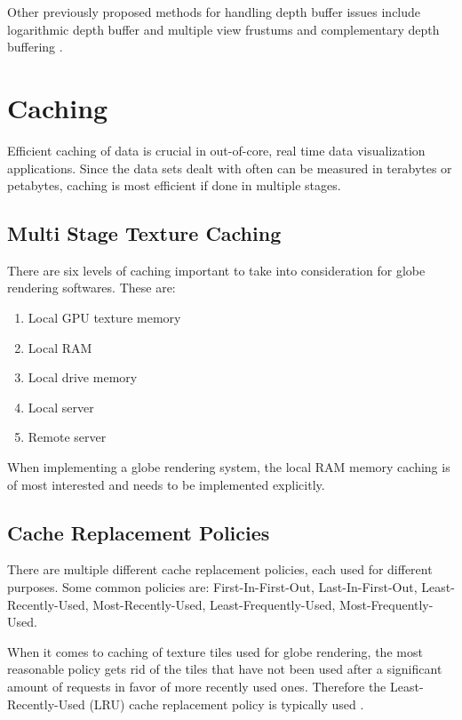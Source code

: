 Other previously proposed methods for handling depth buffer issues include logarithmic depth buffer and multiple view frustums and complementary depth buffering \cite{cozzi11}.

\section{Caching}

Efficient caching of data is crucial in out-of-core, real time data visualization applications. Since the data sets dealt with often can be measured in terabytes or petabytes, caching is most efficient if done in multiple stages.

\subsection{Multi Stage Texture Caching}
There are six levels of caching important to take into consideration for globe rendering softwares. These are:

\begin{enumerate}
\item Local GPU texture memory
\item Local RAM
\item Local drive memory
\item Local server
\item Remote server
\end{enumerate}

When implementing a globe rendering system, the local RAM memory caching is of most interested and needs to be implemented explicitly.

\subsection{Cache Replacement Policies}
There are multiple different cache replacement policies, each used for different purposes. Some common policies are: First-In-First-Out, Last-In-First-Out, Least-Recently-Used, Most-Recently-Used, Least-Frequently-Used, Most-Frequently-Used.

When it comes to caching of texture tiles used for globe rendering, the most reasonable policy gets rid of the tiles that have not been used after a significant amount of requests in favor of more recently used ones. Therefore the Least-Recently-Used (LRU) cache replacement policy is typically used \cite[p. 386]{cozzi11}.

